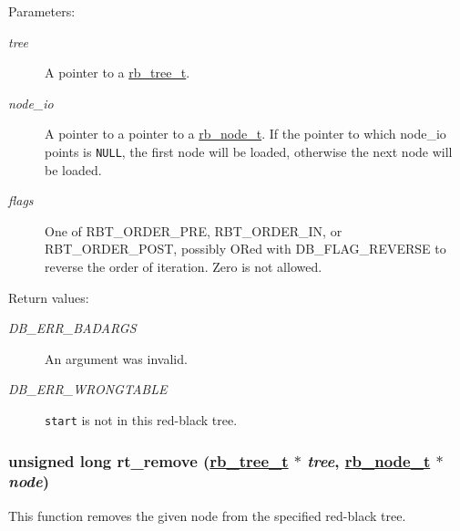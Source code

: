 \begin{Desc}
\item[Parameters:]
\begin{description}
\item[{\em tree}]A pointer to a \hyperlink{group__dbprim__rbtree_a0}{rb\_\-tree\_\-t}. \item[{\em node\_\-io}]A pointer to a pointer to a \hyperlink{group__dbprim__rbtree_a1}{rb\_\-node\_\-t}. If the pointer to which node\_\-io points is {\tt NULL}, the first node will be loaded, otherwise the next node will be loaded. \item[{\em flags}]One of RBT\_\-ORDER\_\-PRE, RBT\_\-ORDER\_\-IN, or RBT\_\-ORDER\_\-POST, possibly ORed with DB\_\-FLAG\_\-REVERSE to reverse the order of iteration. Zero is not allowed.\end{description}
\end{Desc}
\begin{Desc}
\item[Return values:]
\begin{description}
\item[{\em DB\_\-ERR\_\-BADARGS}]An argument was invalid. \item[{\em DB\_\-ERR\_\-WRONGTABLE}]{\tt start} is not in this red-black tree. \end{description}
\end{Desc}
\hypertarget{group__dbprim__rbtree_a8}{
\subsubsection[rt\_\-remove]{\setlength{\rightskip}{0pt plus 5cm}unsigned long rt\_\-remove (\hyperlink{dbprim_8h_a0}{rb\_\-tree\_\-t} $\ast$ {\em tree}, \hyperlink{dbprim_8h_a1}{rb\_\-node\_\-t} $\ast$ {\em node})}}
\label{group__dbprim__rbtree_a8}


This function removes the given node from the specified red-black tree.

